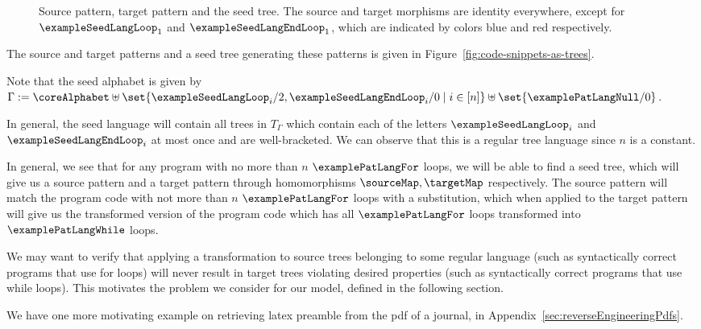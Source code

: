 \begin{figure}
{
}
	\caption{Source pattern, target pattern and the seed tree. The source and target morphisms are identity everywhere, except for $\exampleSeedLangLoop_1$ and $\exampleSeedLangEndLoop_1$,  which  are indicated by colors blue and red respectively.}
    \Description{}
\end{figure}
 
 
 The source and target patterns and a seed tree  generating these patterns is given in Figure~\ref{fig:code-snippets-as-trees}. 

Note that the  seed alphabet is given by $\Gamma := \coreAlphabet \uplus \set{\exampleSeedLangLoop_i/2, \exampleSeedLangEndLoop_i/0 \mid i \in [n]} \uplus \set{\examplePatLangNull/0}$. 


In general, the seed language will contain all  trees in $T_{\Gamma}$ which contain each of the letters $\exampleSeedLangLoop_i$ and $\exampleSeedLangEndLoop_i$ at most once and are well-bracketed. We can observe that this is a regular tree language since $n$ is a constant.


In general, we see that for any program with no more than $n$ $\examplePatLangFor$ loops, we will be able to find a seed tree, which will give us a source pattern and a target pattern through homomorphisms $\sourceMap, \targetMap$ respectively. The source pattern will match the program code with not more than $n$ $\examplePatLangFor$ loops with a substitution, which when applied to the target pattern will give us the transformed version of the program code which has all $\examplePatLangFor$ loops transformed into $\examplePatLangWhile$ loops. 

We may want to verify that applying a transformation to source trees belonging to some regular language (such as syntactically correct programs that use for loops) will never result in target trees violating desired properties (such as syntactically correct programs that use while loops). This motivates the problem we consider for our model, defined in the following section.

We have one more motivating example on retrieving latex preamble from the pdf of a journal, in Appendix~\ref{sec:reverseEngineeringPdfs}.
